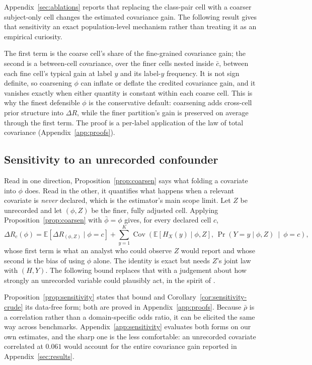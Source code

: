 Appendix~\ref{sec:ablations} reports that replacing the class-pair cell with a coarser
subject-only cell changes the estimated covariance gain. The following result gives that
sensitivity an exact population-level mechanism rather than treating it as an empirical
curiosity.


The first term is the coarse cell's share of the fine-grained covariance gain; the second is
a between-cell covariance, over the finer cells nested inside $\bar c$, between each fine
cell's typical gain at label $y$ and its label-$y$ frequency. It is not sign definite, so
coarsening $\phi$ can inflate or deflate the credited covariance gain, and it vanishes
exactly when either quantity is constant within each coarse cell. This is why the finest
defensible $\phi$ is the conservative default: coarsening adds cross-cell prior structure
into $\Delta R$, while the finer partition's gain is preserved on average through the first
term. The proof is a per-label application of the law of total covariance
(Appendix~\ref{app:proofs}).

\subsection{Sensitivity to an unrecorded confounder}\label{sec:sensitivity}

Read in one direction, Proposition~\ref{prop:coarsen} says what folding a covariate into
$\phi$ does. Read in the other, it quantifies what happens when a relevant covariate is
\emph{never} declared, which is the estimator's main scope limit. Let $Z$ be unrecorded and
let $(\phi,Z)$ be the finer, fully adjusted cell. Applying
Proposition~\ref{prop:coarsen} with $\bar\phi=\phi$ gives, for every declared cell $c$,
\begin{equation}
\Delta R_c(\phi)=\mathbb E\!\left[\Delta R_{(\phi,Z)}\mid\phi=c\right]
+\sum_{y=1}^K\operatorname{Cov}\!\left(\mathbb E[H_X(y)\mid\phi,Z],\,
\Pr(Y=y\mid\phi,Z)\ \middle|\ \phi=c\right),
\label{eq:sensitivity-exact}
\end{equation}
whose first term is what an analyst who could observe $Z$ would report and whose second is
the bias of using $\phi$ alone. The identity is exact but needs $Z$'s joint law with
$(H,Y)$. The following bound replaces that with a judgement about how strongly an unrecorded
variable could plausibly act, in the spirit of \citet{rosenbaum2002observational}.

Proposition~\ref{prop:sensitivity} states that bound and Corollary~\ref{cor:sensitivity-crude}
its data-free form; both are proved in Appendix~\ref{app:proofs}. Because $\bar\rho$ is a
correlation rather than a domain-specific odds ratio, it can be elicited the same way across
benchmarks. Appendix~\ref{app:sensitivity} evaluates both forms on our own estimates, and
the sharp one is the less comfortable: an unrecorded covariate correlated at $0.061$ would
account for the entire covariance gain reported in Appendix~\ref{sec:results}.



